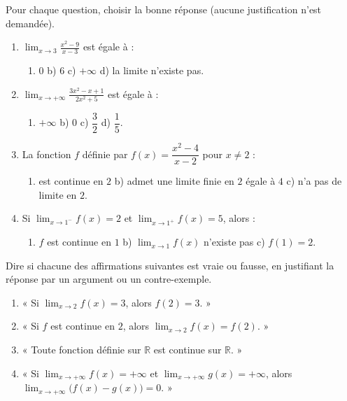 \documentclass[11pt]{article}
\begin{document}
\begin{exercice}
Pour chaque question, choisir la bonne réponse (aucune justification n'est demandée).
\begin{enumerate}
\item $\displaystyle\lim_{x\to 3}\frac{x^2-9}{x-3}$ est égale à :
\begin{enumerate}
\item[a)] $0$ \qquad b) $6$ \qquad c) $+\infty$ \qquad d) la limite n'existe pas.
\end{enumerate}
\item $\displaystyle\lim_{x\to +\infty}\frac{3x^2-x+1}{2x^2+5}$ est égale à :
\begin{enumerate}
\item[a)] $+\infty$ \qquad b) $0$ \qquad c) $\dfrac{3}{2}$ \qquad d) $\dfrac{1}{5}$.
\end{enumerate}
\item La fonction $f$ définie par $f(x)=\dfrac{x^2-4}{x-2}$ pour $x\neq 2$ :
\begin{enumerate}
\item[a)] est continue en $2$ \qquad b) admet une limite finie en $2$ égale à $4$ \qquad c) n'a pas de limite en $2$.
\end{enumerate}
\item Si $\displaystyle\lim_{x\to 1^-}f(x)=2$ et $\displaystyle\lim_{x\to 1^+}f(x)=5$, alors :
\begin{enumerate}
\item[a)] $f$ est continue en $1$ \qquad b) $\displaystyle\lim_{x\to 1}f(x)$ n'existe pas \qquad c) $f(1)=2$.
\end{enumerate}
\end{enumerate}
\end{exercice}

\begin{exercice}
Dire si chacune des affirmations suivantes est vraie ou fausse, en justifiant la réponse par un argument ou un contre-exemple.
\begin{enumerate}
\item « Si $\displaystyle\lim_{x\to 2}f(x)=3$, alors $f(2)=3$. »
\item « Si $f$ est continue en $2$, alors $\displaystyle\lim_{x\to 2}f(x)=f(2)$. »
\item « Toute fonction définie sur $\mathbb{R}$ est continue sur $\mathbb{R}$. »
\item « Si $\displaystyle\lim_{x\to +\infty}f(x)=+\infty$ et $\displaystyle\lim_{x\to +\infty}g(x)=+\infty$, alors $\displaystyle\lim_{x\to +\infty}\big(f(x)-g(x)\big)=0$. »
\end{enumerate}
\end{exercice}
\end{document}
